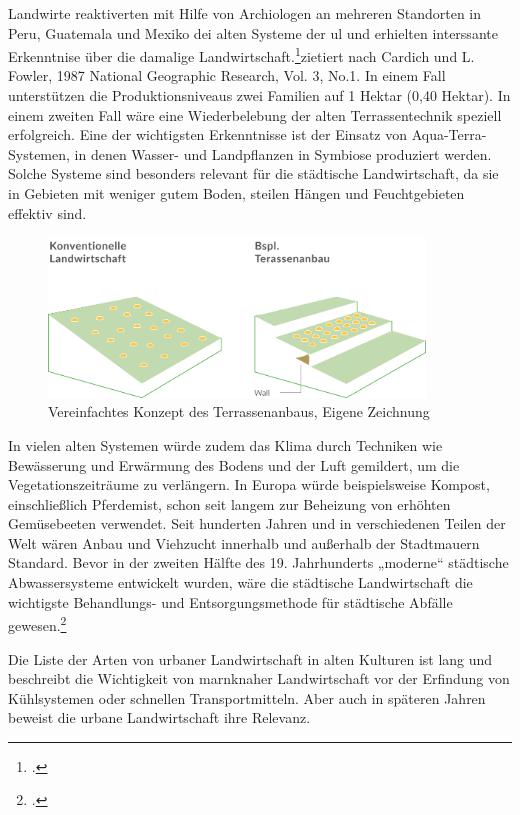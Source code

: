 \documentclass{scrartcl}
\begin{document}
Landwirte reaktiverten mit Hilfe von Archiologen an mehreren Standorten in Peru, Guatemala und Mexiko dei alten Systeme der \acs{ul} und erhielten interssante Erkenntnise über die damalige Landwirtschaft.\footcite[Vgl.][S. 6]{Smit2001UrbanCities}{zietiert nach Cardich und L. Fowler, 1987 National Geographic Research, Vol. 3, No.1.}
In einem Fall unterstützen die Produktionsniveaus zwei Familien auf 1 Hektar (0,40 Hektar). In einem zweiten Fall wäre eine Wiederbelebung der alten Terrassentechnik speziell erfolgreich. Eine der wichtigsten Erkenntnisse ist der Einsatz von Aqua-Terra-Systemen, in denen Wasser- und Landpflanzen in Symbiose produziert werden. Solche Systeme sind besonders relevant für die städtische Landwirtschaft, da sie in Gebieten mit weniger gutem Boden, steilen Hängen und Feuchtgebieten effektiv sind. 

\begin{figure}[htbp]
\centering
\includegraphics[width=10cm]{image_folder/SchaubildTerassenanbau.png}
\caption{Vereinfachtes Konzept des Terrassenanbaus, Eigene Zeichnung}
\label{fig:Terassenlandwirtschaft}
\end{figure}

In vielen alten Systemen würde zudem das Klima durch Techniken wie Bewässerung und Erwärmung des Bodens und der Luft gemildert, um die Vegetationszeiträume zu verlängern. In Europa würde beispielsweise Kompost, einschließlich Pferdemist, schon seit langem zur Beheizung von erhöhten Gemüsebeeten verwendet. Seit hunderten Jahren und in verschiedenen Teilen der Welt wären Anbau und Viehzucht innerhalb und außerhalb der Stadtmauern Standard. Bevor in der zweiten Hälfte des 19. Jahrhunderts „moderne“ städtische Abwassersysteme entwickelt wurden, wäre die städtische Landwirtschaft die wichtigste Behandlungs- und Entsorgungsmethode für städtische Abfälle gewesen.\footcite[Vgl.][S. 6-7]{Smit2001UrbanCities}

Die Liste der Arten von urbaner Landwirtschaft in alten Kulturen ist lang und beschreibt die Wichtigkeit von marnknaher Landwirtschaft vor der Erfindung von Kühlsystemen oder schnellen Transportmitteln. Aber auch in späteren Jahren beweist die urbane Landwirtschaft ihre Relevanz.
\end{document}
